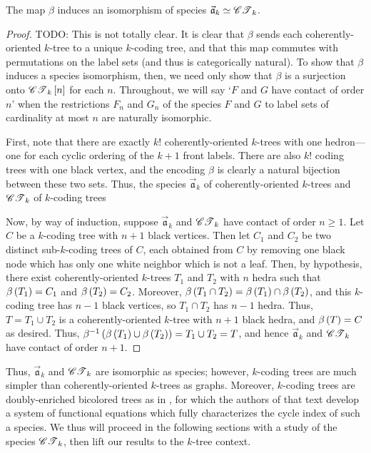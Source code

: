 \documentclass[sectionflow,singlespace,twoside,boldmathhdr,draft]{brandiss} %
\numberwithin{section}{chapter}
\numberwithin{figure}{chapter}
\begin{document}
\begin{theorem}\label{thm:bctreeenc}
  The map $\beta$ induces an isomorphism of species $\vec{\mathfrak{a}}_{k} \simeq \mathscr{CT}_{k}$.
\end{theorem}

\begin{proof}
  TODO: This is not totally clear.
  It is clear that $\beta$ sends each coherently-oriented $k$-tree to a unique $k$-coding tree, and that this map commutes with permutations on the label sets (and thus is categorically natural).
  To show that $\beta$ induces a species isomorphism, then, we need only show that $\beta$ is a surjection onto $\mathscr{CT}_{k} \left[ {n} \right]$ for each $n$.
  Throughout, we will say `$F$ and $G$ have contact of order $n$' when the restrictions $F_{n}$ and $G_{n}$ of the species $F$ and $G$ to label sets of cardinality at most $n$ are naturally isomorphic.
  
  First, note that there are exactly $k!$ coherently-oriented $k$-trees with one hedron---one for each cyclic ordering of the $k+1$ front labels.
  There are also $k!$ coding trees with one black vertex, and the encoding $\beta$ is clearly a natural bijection between these two sets.
  Thus, the species $\vec{\mathfrak{a}}_{k}$ of coherently-oriented $k$-trees and $\mathscr{CT}_{k}$ of $k$-coding trees 

  Now, by way of induction, suppose $\vec{\mathfrak{a}}_{k}$ and $\mathscr{CT}_{k}$ have contact of order $n \geq 1$.
  Let $C$ be a $k$-coding tree with $n+1$ black vertices.
  Then let $C_{1}$ and $C_{2}$ be two distinct sub-$k$-coding trees of $C$, each obtained from $C$ by removing one black node which has only one white neighbor which is not a leaf.
  Then, by hypothesis, there exist coherently-oriented $k$-trees $T_{1}$ and $T_{2}$ with $n$ hedra such that $\beta \left( {T_{1}} \right) = C_{1}$ and $\beta \left( {T_{2}} \right) = C_{2}$.
  Moreover, $\beta \left( {T_{1} \cap T_{2}} \right) = \beta \left( {T_{1}} \right) \cap \beta \left( {T_{2}} \right)$, and this $k$-coding tree has $n-1$ black vertices, so $T_{1} \cap T_{2}$ has $n-1$ hedra.
  Thus, $T = T_{1} \cup T_{2}$ is a coherently-oriented $k$-tree with $n+1$ black hedra, and $\beta \left( {T} \right) = C$ as desired.
  Thus, $\beta^{-1} \left( {\beta \left( {T_{1}} \right) \cup \beta \left( {T_{2}} \right)} \right) = T_{1} \cup T_{2} = T$, and hence $\vec{\mathfrak{a}}_{k}$ and $\mathscr{CT}_{k}$ have contact of order $n+1$.
\end{proof}

Thus, $\vec{\mathfrak{a}}_{k}$ and $\mathscr{CT}_{k}$ are isomorphic as species; however, $k$-coding trees are much simpler than coherently-oriented $k$-trees as graphs.
Moreover, $k$-coding trees are doubly-enriched bicolored trees as in \cite[\S 3.2]{bll:species}, for which the authors of that text develop a system of functional equations which fully characterizes the cycle index of such a species.
We thus will proceed in the following sections with a study of the species $\mathscr{CT}_{k}$, then lift our results to the $k$-tree context.
\end{document}
